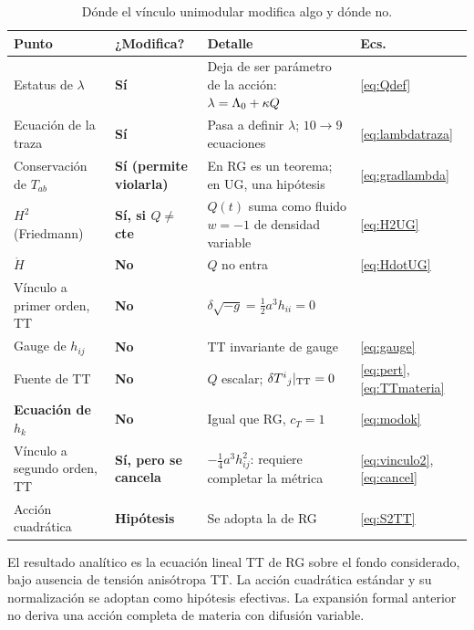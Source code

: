 \begin{table}[t]
\centering\small
\renewcommand{\arraystretch}{1.25}
\begin{tabular}{@{}p{3.9cm}p{2.7cm}p{5.3cm}p{2.1cm}@{}}
\toprule
\textbf{Punto} & \textbf{¿Modifica?} & \textbf{Detalle} & \textbf{Ecs.}\\
\midrule
Estatus de $\lambda$ & \textbf{Sí} & Deja de ser parámetro de la acción: $\lambda=\Lambda_0+\kappa Q$ & \eqref{eq:Qdef}\\
Ecuación de la traza & \textbf{Sí} & Pasa a definir $\lambda$; $10\to9$ ecuaciones & \eqref{eq:lambdatraza}\\
Conservación de $T_{ab}$ & \textbf{Sí (permite violarla)} & En RG es un teorema; en UG, una hipótesis & \eqref{eq:gradlambda}\\
$H^2$ (Friedmann) & \textbf{Sí, si $Q\neq$ cte} & $Q(t)$ suma como fluido $w=-1$ de densidad variable & \eqref{eq:H2UG}\\
$\dot H$ & \textbf{No} & $Q$ no entra & \eqref{eq:HdotUG}\\
Vínculo a primer orden, TT & \textbf{No} & $\delta\sqrt{-g}=\tfrac12a^3h_{ii}=0$ & \\
Gauge de $h_{ij}$ & \textbf{No} & TT invariante de gauge & \eqref{eq:gauge}\\
Fuente de TT & \textbf{No} & $Q$ escalar; $\delta T^i{}_j|_{\rm TT}=0$ & \eqref{eq:pert}, \eqref{eq:TTmateria}\\
\textbf{Ecuación de $h_k$} & \textbf{No} & Igual que RG, $c_T=1$ & \eqref{eq:modok}\\
Vínculo a segundo orden, TT & \textbf{Sí, pero se cancela} & $-\tfrac14a^3h_{ij}^2$: requiere completar la métrica & \eqref{eq:vinculo2}, \eqref{eq:cancel}\\
Acción cuadrática & \textbf{Hipótesis} & Se adopta la de RG & \eqref{eq:S2TT}\\
\bottomrule
\end{tabular}
\caption{Dónde el vínculo unimodular modifica algo y dónde no.}
\label{tab:donde}
\end{table}

El resultado analítico es la ecuación lineal TT de RG sobre el fondo considerado, bajo ausencia de tensión anisótropa TT. La acción cuadrática estándar y su normalización se adoptan como hipótesis efectivas. La expansión formal anterior no deriva una acción completa de materia con difusión variable.
